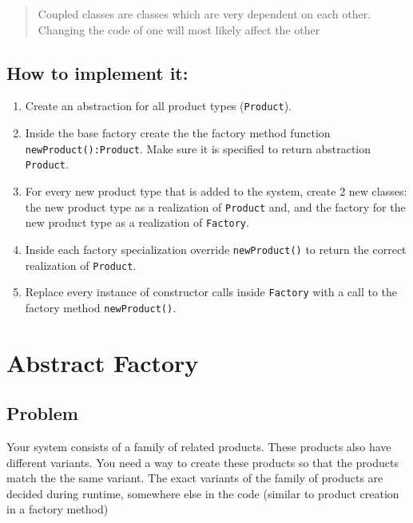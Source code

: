 \begin{quote}
Coupled classes are classes which are very dependent on each other.
Changing the code of one will most likely affect the other
\end{quote}

\subsection{How to implement
it:}\label{creational-patterns.md__how-to-implement-it}

\begin{enumerate}
\def\labelenumi{\arabic{enumi}.}
\tightlist
\item
  Create an abstraction for all product types (\texttt{Product}).
\item
  Inside the base factory create the the factory method function
  \texttt{newProduct():Product}. Make sure it is specified to return
  abstraction \texttt{Product}.\\
\item
  For every new product type that is added to the system, create 2 new
  classes: the new product type as a realization of \texttt{Product}
  and, and the factory for the new product type as a realization of
  \texttt{Factory}.
\item
  Inside each factory specialization override \texttt{newProduct()} to
  return the correct realization of \texttt{Product}.
\item
  Replace every instance of constructor calls inside \texttt{Factory}
  with a call to the factory method \texttt{newProduct()}.
\end{enumerate}

\section{Abstract
Factory}\label{creational-patterns.md__abstract-factory}

\subsection{Problem}\label{creational-patterns.md__problem-1}

Your system consists of a family of related products. These products
also have different variants. You need a way to create these products so
that the products match the the same variant. The exact variants of the
family of products are decided during runtime, somewhere else in the
code (similar to product creation in a factory method)

